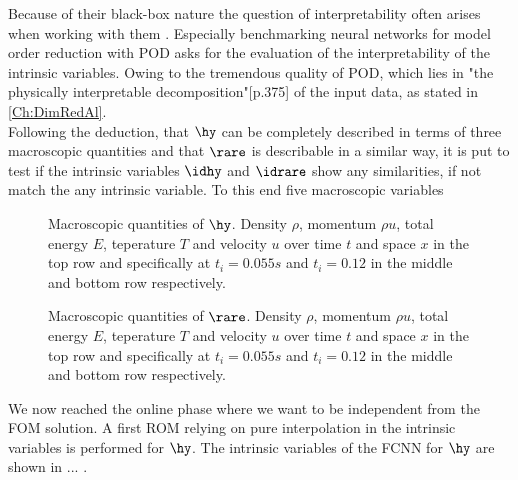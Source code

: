 Because of their black-box nature the question of interpretability often arises when working with them \cite{fan2021interpretability}. Especially benchmarking neural networks for model order reduction with POD asks for the evaluation of the interpretability of the intrinsic variables. Owing to the tremendous quality of POD, which lies in "the physically interpretable decomposition"\cite{Kutz}[p.375] of the input data, as stated in \cref{Ch:DimRedAl}. \\
Following the deduction, that \(\hy\) can be completely described in terms of three macroscopic quantities and that \(\rare\) is describable in a similar way, it is put to test if the intrinsic variables \(\idhy\) and \(\idrare\) show any similarities, if not match the any intrinsic variable. To this end five macroscopic variables  
\begin{figure}[H]
	
	\caption{Macroscopic quantities of \(\hy\). Density \(\rho\), momentum \(\rho u\), total energy \(E\), teperature \(T\) and velocity \(u\) over time \(t\) and space \(x\) in the top row and specifically at \(t_i=0.055s\) and \(t_i=0.12\) in the middle and bottom row respectively.}
	\label{Fig: Macro_hy}
\end{figure}
\begin{figure}[H]
	
		\caption{Macroscopic quantities of \(\rare\). Density \(\rho\), momentum \(\rho u\), total energy \(E\), teperature \(T\) and velocity \(u\) over time \(t\) and space \(x\) in the top row and specifically at \(t_i=0.055s\) and \(t_i=0.12\) in the middle and bottom row respectively.}
	\label{Fig: Macro_rare}
\end{figure}
\begin{figure}[H]
	\centering
	
\end{figure}
\begin{figure}[H]
	
\end{figure}
\begin{figure}
	
\end{figure}
We now reached the online phase where we want to be independent from the FOM solution. A first ROM relying on pure interpolation in the intrinsic variables is performed for \(\hy\). The intrinsic variables of the FCNN for \(\hy\) are shown in ... . 

